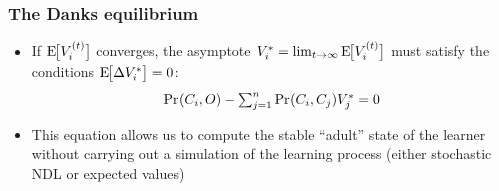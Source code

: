 \begin{frame}
\end{frame}

\begin{frame}
  \frametitle{The Danks equilibrium}

  \begin{itemize}
  \item If $\mathrm{E}_{}\!\bigl[V_i^{(t)}\bigr]$ converges, the asymptote $V_i^* = \lim_{t\to \infty} \mathrm{E}_{}\!\bigl[V_i^{(t)}\bigr]$ must satisfy the  conditions $\mathrm{E}_{}\!\bigl[\Delta V_i^*\bigr] = 0$:
    \[
    \mathop{\mathrm{Pr}_{}}(C_i, O) - \textstyle\sum_{j=1}^n \mathop{\mathrm{Pr}_{}}(C_i, C_j) V_j^* = 0
    \]
    \citep[p.~113]{Danks:03}
  \item This equation allows us to compute the stable ``adult'' state of the learner without carrying out a simulation of the learning process (either stochastic NDL or expected values)
  \end{itemize}
\end{frame}

